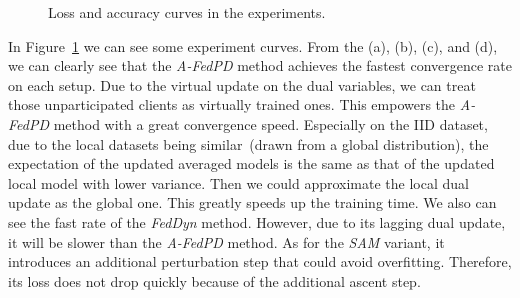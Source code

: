 \begin{figure}[h]
\vskip -0.1in
\caption{Loss and accuracy curves in the experiments.}
\label{curves}
\vskip -0.1in
\end{figure}
In Figure~\ref{curves} we can see some experiment curves. From the (a), (b), (c), and (d), we can clearly see that the \textit{A-FedPD} method achieves the fastest convergence rate on each setup. Due to the virtual update on the dual variables, we can treat those unparticipated clients as virtually trained ones. This empowers the \textit{A-FedPD} method with a great convergence speed. Especially on the IID dataset, due to the local datasets being similar~(drawn from a global distribution), the expectation of the updated averaged models is the same as that of the updated local model with lower variance. Then we could approximate the local dual update as the global one. This greatly speeds up the training time. We also can see the fast rate of the \textit{FedDyn} method. However, due to its lagging dual update, it will be slower than the \textit{A-FedPD} method. As for the \textit{SAM} variant, it introduces an additional perturbation step that could avoid overfitting. Therefore, its loss does not drop quickly because of the additional ascent step.

